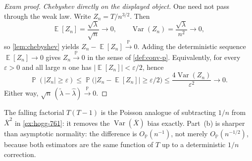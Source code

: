 \documentclass[11pt,a4paper]{article}
\DeclareMathOperator{\Var}{Var}
\DeclareMathOperator{\E}{\mathbb{E}}
\DeclareMathOperator{\Pbb}{\mathbb{P}}
\begin{document}
\begin{proof}[Exam proof]
\emph{Chebyshev directly on the displayed object.} One need not pass through the weak law. Write \(Z_n=T/n^{3/2}\). Then
\[
\E[Z_n]
=
\frac{\sqrt{\lambda}}{\sqrt{n}}\to 0,
\qquad
\Var(Z_n)
=
\frac{\sqrt{\lambda}}{n^{2}}\to 0,
\]
so \cref{lem:chebyshev} yields \(Z_n-\E[Z_n]\xrightarrow{\Pbb}0\). Adding the deterministic sequence \(\E[Z_n]\to 0\) gives \(Z_n\xrightarrow{\Pbb}0\) in the sense of \cref{def:conv-p}. Equivalently, for every \(\varepsilon>0\) and all large \(n\) one has \(|\E[Z_n]|<\varepsilon/2\), hence
\[
\Pbb(|Z_n|\ge\varepsilon)
\le
\Pbb\bigl(|Z_n-\E[Z_n]|\ge\varepsilon/2\bigr)
\le
\frac{4\Var(Z_n)}{\varepsilon^{2}}
\to 0.
\]
Either way, \(\sqrt{n}\,(\tilde{\lambda}-\hat{\lambda})\xrightarrow{\Pbb}0\).
\end{proof}

\begin{remark}
\label{rem:p10-checks}
The falling factorial \(T(T-1)\) is the Poisson analogue of subtracting \(1/n\) from \(\overline{X}^{2}\) in \cref{ex:hogg-761}: it removes the \(\Var(\overline{X})\) bias exactly. Part~(b) is sharper than asymptotic normality: the difference is \(O_{\Pbb}(n^{-1})\), not merely \(O_{\Pbb}(n^{-1/2})\), because both estimators are the same function of \(T\) up to a deterministic \(1/n\) correction.
\end{remark}
\end{document}
